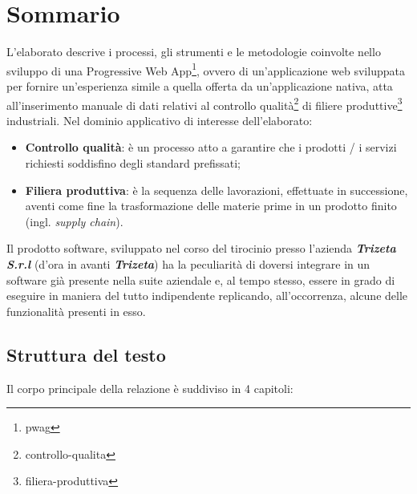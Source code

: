\cleardoublepage
{}
{}
\begingroup
\let\clearpage\relax
\let\cleardoublepage\relax
\let\cleardoublepage\relax

\chapter*{Sommario}
L'elaborato descrive i processi, gli strumenti e le metodologie coinvolte nello sviluppo di una Progressive Web App\footnote{\gls{pwag}}, ovvero di un'applicazione web sviluppata per fornire un'esperienza simile a quella offerta da un'applicazione nativa, 
atta all'inserimento manuale di dati relativi al controllo qualità\footnote{\gls{controllo-qualita}} di 
filiere produttive\footnote{\gls{filiera-produttiva}} industriali. 
\newline
Nel dominio applicativo di interesse dell'elaborato:
\begin{itemize}
    \item \textbf{Controllo qualità}: è un processo atto a garantire che i prodotti / i servizi richiesti soddisfino degli standard prefissati;
    \item \textbf{Filiera produttiva}: è la sequenza delle lavorazioni, effettuate in successione, aventi come fine la trasformazione delle materie prime in un prodotto finito (ingl. \textit{supply chain}).
\end{itemize} 
Il prodotto software, sviluppato nel corso del tirocinio presso l'azienda \textit{\textbf{Trizeta S.r.l}} (d'ora in avanti \textit{\textbf{Trizeta}}) ha la peculiarità di doversi integrare in un software già presente nella suite aziendale e, al tempo stesso, essere in grado di eseguire in maniera del tutto indipendente replicando, all'occorrenza, alcune delle funzionalità presenti in esso.

\section*{Struttura del testo}

Il corpo principale della relazione è suddiviso in 4 capitoli:

